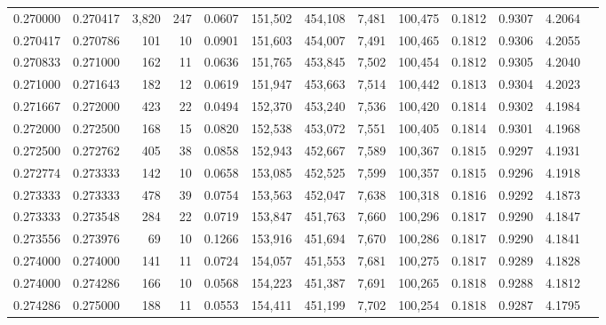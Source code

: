 \begin{tabular}{rrrrrrrrrrrrr}
0.270000 & 0.270417 & 3,820 & 247 &                                     0.0607 & 151,502 & 454,108 &   7,481 & 100,475 & 0.1812 & 0.9307 & 4.2064 \\
0.270417 & 0.270786 &   101 &  10 &                                     0.0901 & 151,603 & 454,007 &   7,491 & 100,465 & 0.1812 & 0.9306 & 4.2055 \\
0.270833 & 0.271000 &   162 &  11 &                                     0.0636 & 151,765 & 453,845 &   7,502 & 100,454 & 0.1812 & 0.9305 & 4.2040 \\
0.271000 & 0.271643 &   182 &  12 &                                     0.0619 & 151,947 & 453,663 &   7,514 & 100,442 & 0.1813 & 0.9304 & 4.2023 \\
0.271667 & 0.272000 &   423 &  22 &                                     0.0494 & 152,370 & 453,240 &   7,536 & 100,420 & 0.1814 & 0.9302 & 4.1984 \\
0.272000 & 0.272500 &   168 &  15 &                                     0.0820 & 152,538 & 453,072 &   7,551 & 100,405 & 0.1814 & 0.9301 & 4.1968 \\
0.272500 & 0.272762 &   405 &  38 &                                     0.0858 & 152,943 & 452,667 &   7,589 & 100,367 & 0.1815 & 0.9297 & 4.1931 \\
0.272774 & 0.273333 &   142 &  10 &                                     0.0658 & 153,085 & 452,525 &   7,599 & 100,357 & 0.1815 & 0.9296 & 4.1918 \\
0.273333 & 0.273333 &   478 &  39 &                                     0.0754 & 153,563 & 452,047 &   7,638 & 100,318 & 0.1816 & 0.9292 & 4.1873 \\
0.273333 & 0.273548 &   284 &  22 &                                     0.0719 & 153,847 & 451,763 &   7,660 & 100,296 & 0.1817 & 0.9290 & 4.1847 \\
0.273556 & 0.273976 &    69 &  10 &                                     0.1266 & 153,916 & 451,694 &   7,670 & 100,286 & 0.1817 & 0.9290 & 4.1841 \\
0.274000 & 0.274000 &   141 &  11 &                                     0.0724 & 154,057 & 451,553 &   7,681 & 100,275 & 0.1817 & 0.9289 & 4.1828 \\
0.274000 & 0.274286 &   166 &  10 &                                     0.0568 & 154,223 & 451,387 &   7,691 & 100,265 & 0.1818 & 0.9288 & 4.1812 \\
0.274286 & 0.275000 &   188 &  11 &                                     0.0553 & 154,411 & 451,199 &   7,702 & 100,254 & 0.1818 & 0.9287 & 4.1795 \\

\end{tabular}
